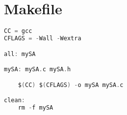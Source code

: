 \documentclass{report}
\begin{document}
\section{Makefile}
\begin{lstlisting}[language=C]
CC = gcc
CFLAGS = -Wall -Wextra

all: mySA

mySA: mySA.c mySA.h

	$(CC) $(CFLAGS) -o mySA mySA.c

clean:
	rm -f mySA
\end{lstlisting}
\end{document}

